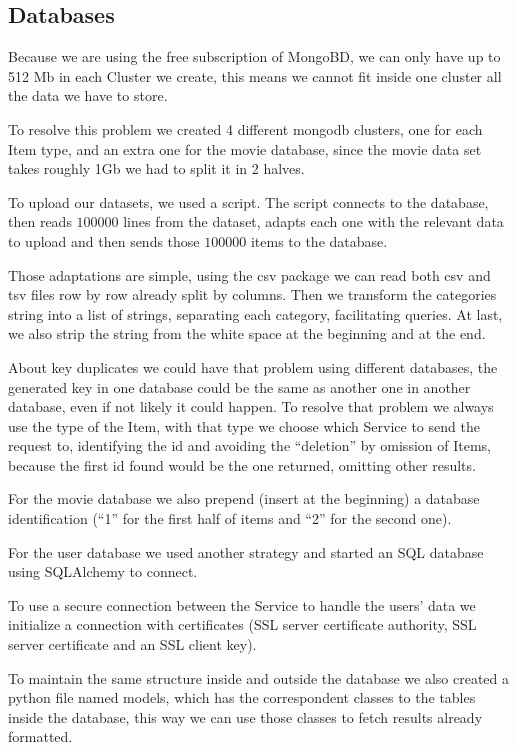 \documentclass[oneside]{article}
\newcommand*\fpar{\hspace{1ex}}
\begin{document}
    \subsection{Databases}
    \fpar Because we are using the free subscription of MongoBD, we can only have up to 512 Mb in each Cluster we create, this means we cannot fit inside one cluster all the data we have to store.
    \par To resolve this problem we created 4 different mongodb clusters, one for each Item type, and an extra one for the movie database, since the movie data set takes roughly 1Gb we had to split it in 2 halves.
    \par To upload our datasets, we used a script. The script connects to the database, then reads $100000$ lines from the dataset, adapts each one with the relevant data to upload and then sends those $100000$ items to the database. 
    \par Those adaptations are simple, using the csv package we can read both csv and tsv files row by row already split by columns. Then we transform the categories string into a list of strings, separating each category, facilitating queries. At last, we also strip the string from the white space at the beginning and at the end.
    \par About key duplicates we could have that problem using different databases, the generated key in one database could be the same as another one in another database, even if not likely it could happen. To resolve that problem we always use the type of the Item, with that type we choose which Service to send the request to, identifying the id and avoiding the “deletion” by omission of Items, because the first id found would be the one returned, omitting other results.
    \par For the movie database we also prepend (insert at the beginning) a database identification (“1” for the first half of items and “2” for the second one).
    \par For the user database we used another strategy and started an SQL database using SQLAlchemy to connect.
    \par To use a secure connection between the Service to handle the users' data we initialize a connection with certificates (SSL server certificate authority, SSL server certificate and an SSL client key).
    \par To maintain the same structure inside and outside the database we also created a python file named models, which has the correspondent classes to the tables inside the database, this way we can use those classes to fetch results already formatted. 
\end{document}
